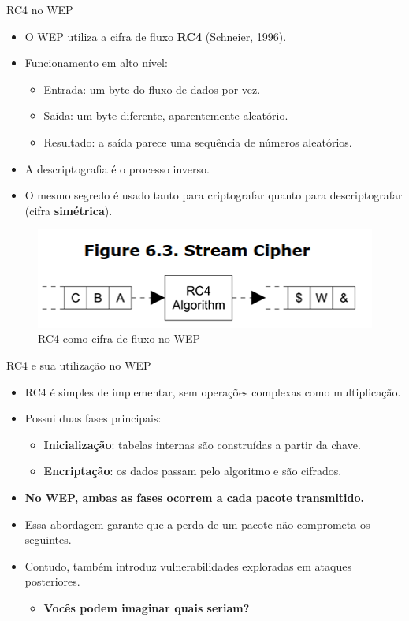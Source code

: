 \begin{frame}{RC4 no WEP}
    \begin{itemize}
        \item O WEP utiliza a cifra de fluxo \textbf{RC4} (Schneier, 1996).
        \item Funcionamento em alto nível:
              \begin{itemize}
                  \item Entrada: um byte do fluxo de dados por vez.
                  \item Saída: um byte diferente, aparentemente aleatório.
                  \item Resultado: a saída parece uma sequência de números aleatórios.
              \end{itemize}
        \item A descriptografia é o processo inverso.
        \item O mesmo segredo é usado tanto para criptografar quanto para descriptografar (cifra \textbf{simétrica}).
    \end{itemize}

    \begin{figure}
        \centering
        \includegraphics[width=0.55\linewidth]{Figuras/rc4-wep-stream.png}
        \caption{RC4 como cifra de fluxo no WEP}
    \end{figure}
\end{frame}

\begin{frame}{RC4 e sua utilização no WEP}
    \begin{itemize}
        \item RC4 é simples de implementar, sem operações complexas como multiplicação.
        \item Possui duas fases principais:
              \begin{itemize}
                  \item \textbf{Inicialização}: tabelas internas são construídas a partir da chave.
                  \item \textbf{Encriptação}: os dados passam pelo algoritmo e são cifrados.
              \end{itemize}
        \item \textbf{No WEP, ambas as fases ocorrem a cada pacote transmitido.}
        \item Essa abordagem garante que a perda de um pacote não comprometa os seguintes.
        \item Contudo, também introduz vulnerabilidades exploradas em ataques posteriores.
              \begin{itemize}
                  \item \textbf{Vocês podem imaginar quais seriam?}
              \end{itemize}
    \end{itemize}
\end{frame}


